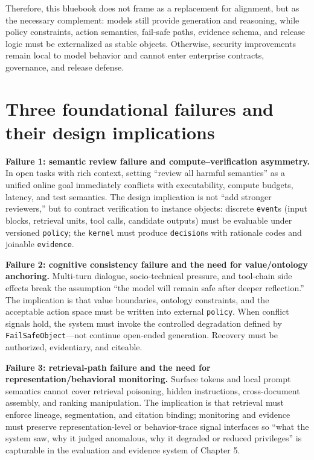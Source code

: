\documentclass[11pt,a4paper]{report}
\begin{document}
Therefore, this bluebook does not frame \DecoupledSafety{} as a replacement for alignment, but as the necessary complement: models still provide generation and reasoning, while policy constraints, action semantics, fail-safe paths, evidence schema, and release logic must be externalized as stable objects. Otherwise, security improvements remain local to model behavior and cannot enter enterprise contracts, governance, and release defense.

\section{Three foundational failures and their design implications}
\textbf{Failure 1: semantic review failure and compute–verification asymmetry.} In open tasks with rich context, setting “review all harmful semantics” as a unified online goal immediately conflicts with executability, compute budgets, latency, and test semantics. The design implication is not “add stronger reviewers,” but to contract verification to instance objects: discrete \texttt{event}s (input blocks, retrieval units, tool calls, candidate outputs) must be evaluable under versioned \texttt{policy}; the \texttt{kernel} must produce \texttt{decision}s with rationale codes and joinable \texttt{evidence}.

\textbf{Failure 2: cognitive consistency failure and the need for value/ontology anchoring.} Multi-turn dialogue, socio-technical pressure, and tool-chain side effects break the assumption “the model will remain safe after deeper reflection.” The implication is that value boundaries, ontology constraints, and the acceptable action space must be written into external \texttt{policy}. When conflict signals hold, the system must invoke the controlled degradation defined by \texttt{FailSafeObject}—not continue open-ended generation. Recovery must be authorized, evidentiary, and citeable.

\textbf{Failure 3: retrieval-path failure and the need for representation/behavioral monitoring.} Surface tokens and local prompt semantics cannot cover retrieval poisoning, hidden instructions, cross-document assembly, and ranking manipulation. The implication is that retrieval must enforce lineage, segmentation, and citation binding; monitoring and evidence must preserve representation-level or behavior-trace signal interfaces so “what the system saw, why it judged anomalous, why it degraded or reduced privileges” is capturable in the evaluation and evidence system of Chapter 5.
\end{document}
